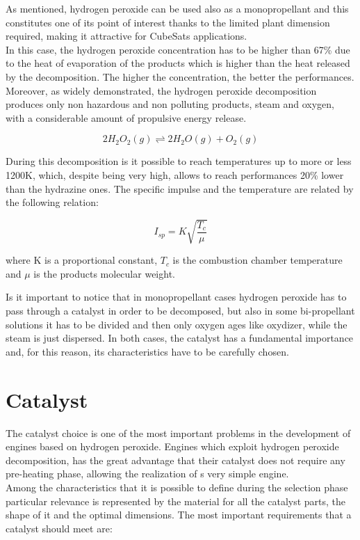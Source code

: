 \documentclass[a4paper]{report}
\begin{document}
As mentioned, hydrogen peroxide can be used also as a monopropellant and this constitutes one of its point of interest thanks to the limited plant dimension required, making it attractive for CubeSats applications. \\ 
In this case, the hydrogen peroxide concentration has to be higher than 67\% due to the heat of evaporation of the products which is higher than the heat released by the decomposition. The higher the concentration, the better the performances.\\ %
Moreover, as widely demonstrated, the hydrogen peroxide decomposition produces only non hazardous and non polluting products, steam and oxygen, with a considerable amount of propulsive energy release.

\begin{equation}
2H_2O_2 (g) \rightleftharpoons 2H_2O (g) + O_2 (g)
\end{equation}

During this decomposition is it possible to reach temperatures up to more or less 1200K, which, despite being very high, allows to reach performances 20\% lower than the hydrazine ones. The specific impulse and the temperature are related by the following relation:

\begin{equation}
I_{sp}=K\sqrt{\frac{T_c}{\mu}}
\end{equation} 

where K is a proportional constant, $T_c$ is the combustion chamber temperature and $\mu$ is the products molecular weight. \\

\vspace{1cm}

Is it important to notice that in monopropellant cases hydrogen peroxide has to pass through a catalyst in order to be decomposed, but also in some bi-propellant solutions it has to be divided and then only oxygen ages like oxydizer, while the steam is just dispersed. In both cases, the catalyst has a fundamental importance and, for this reason, its characteristics have to be carefully chosen. \\ 

\section{Catalyst}

The catalyst choice is one of the most important problems in the development of engines based on hydrogen peroxide. Engines which exploit hydrogen peroxide decomposition, has the great advantage that their catalyst does not require any pre-heating phase, allowing the realization of s very simple engine. \\
Among the characteristics that it is possible to define during the selection phase particular relevance is represented by the material for all the catalyst parts, the shape of it and the optimal dimensions. The most important requirements that a catalyst should meet are: %
\end{document}
